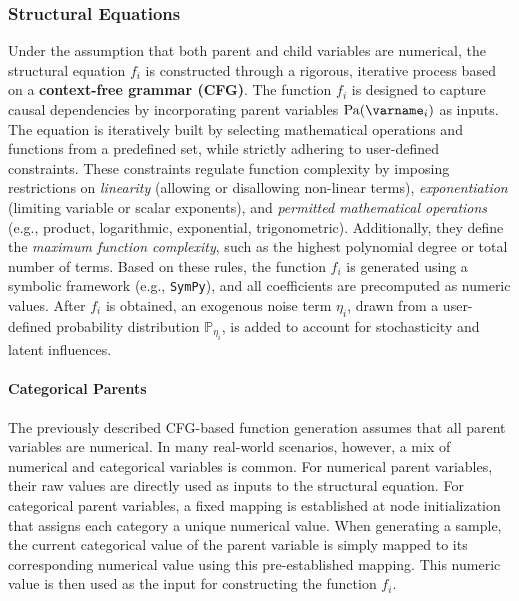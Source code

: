 \documentclass{uai2024} %
\begin{document}
        \subsubsection{Structural Equations}
            Under the assumption that both parent and child variables are numerical, the structural equation $f_i$ is constructed through a rigorous, iterative process based on a \textbf{context-free grammar (CFG)}. 
            The function $f_i$ is designed to capture causal dependencies by incorporating parent variables $\text{Pa}(\varname_i)$ as inputs. 
            The equation is iteratively built by selecting mathematical operations and functions from a predefined set, while strictly adhering to user-defined constraints. 
            These constraints regulate function complexity by imposing restrictions on \emph{linearity} (allowing or disallowing non-linear terms), \emph{exponentiation} (limiting variable or scalar exponents), and \emph{permitted mathematical operations} (e.g., product, logarithmic, exponential, trigonometric). Additionally, they define the \emph{maximum function complexity}, such as the highest polynomial degree or total number of terms.
            Based on these rules, the function $f_i$ is generated using a symbolic framework (e.g., \texttt{SymPy}), and all coefficients are precomputed as numeric values. 
            After $f_i$ is obtained, an exogenous noise term $\eta_i$, drawn from a user-defined probability distribution $\mathbb{P}_{\eta_i}$, is added to account for stochasticity and latent influences. 

        
            \paragraph{Categorical Parents}
                The previously described CFG-based function generation assumes that all parent variables are numerical. 
                In many real-world scenarios, however, a mix of numerical and categorical variables is common. 
                For numerical parent variables, their raw values are directly used as inputs to the structural equation. 
                For categorical parent variables, a fixed mapping is established at node initialization that assigns each category a unique numerical value. 
                When generating a sample, the current categorical value of the parent variable is simply mapped to its corresponding numerical value using this pre-established mapping. 
                This numeric value is then used as the input for constructing the function \( f_i \). 
\end{document}
